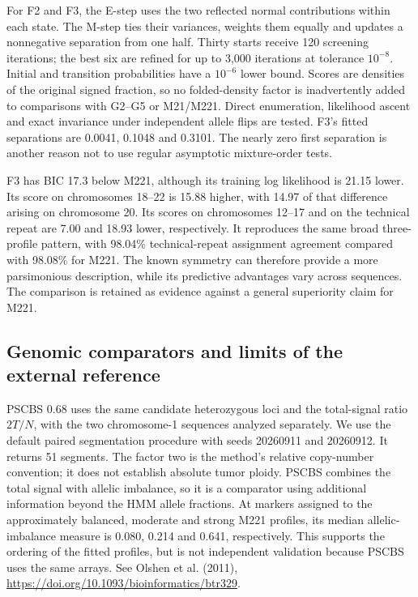 \documentclass[11pt]{article}
\begin{document}
For F2 and F3, the E-step uses the two reflected normal contributions within
each state. The M-step ties their variances, weights them equally and updates
a nonnegative separation from one half. Thirty starts receive 120 screening
iterations; the best six are refined for up to 3,000 iterations at tolerance
$10^{-8}$. Initial and transition probabilities have a $10^{-6}$ lower bound.
Scores are densities of the original signed fraction, so no folded-density
factor is inadvertently added to comparisons with G2--G5 or M21/M221.
Direct enumeration, likelihood ascent and exact invariance under independent
allele flips are tested. F3's fitted separations are 0.0041, 0.1048 and 0.3101.
The nearly zero first separation is another reason not to use regular
asymptotic mixture-order tests.

F3 has BIC 17.3 below M221, although its training log likelihood is
21.15 lower. Its score on chromosomes 18--22 is 15.88 higher, with 14.97
of that difference arising on chromosome 20. Its scores on chromosomes
12--17 and on the technical repeat are 7.00 and 18.93 lower, respectively.
It reproduces the same broad three-profile pattern, with 98.04\%
technical-repeat assignment agreement compared with 98.08\% for M221.
The known symmetry can therefore provide a more parsimonious description,
while its predictive advantages vary across sequences. The comparison is
retained as evidence against a general superiority claim for M221.

\subsection{Genomic comparators and limits of the external reference}\label{sec:si-genomic-comparators}

PSCBS 0.68 uses the same candidate heterozygous loci and the total-signal
ratio $2T/N$, with the two chromosome-1 sequences analyzed separately.
We use the default paired segmentation procedure with seeds 20260911 and
20260912. It returns 51 segments. The factor two is the method's relative
copy-number convention; it does not establish absolute tumor ploidy.
PSCBS combines the total signal with allelic imbalance, so it is a
comparator using additional information beyond the HMM allele fractions.
At markers assigned to the approximately balanced, moderate and strong
M221 profiles, its median allelic-imbalance measure is 0.080, 0.214 and
0.641, respectively. This supports the ordering of the fitted profiles,
but is not independent validation because PSCBS uses the same arrays. See Olshen et al. (2011),
\url{https://doi.org/10.1093/bioinformatics/btr329}.
\end{document}
